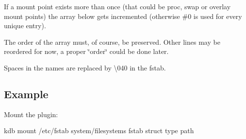 If a mount point exists more than once (that could be proc, swap or overlay mount points) the array below gets incremented (otherwise \#0 is used for every unique entry).

The order of the array must, of course, be preserved. Other lines may be reordered for now, a proper \char`\"{}order\char`\"{} could be done later.

Spaces in the names are replaced by \textbackslash{}040 in the fstab.

\subsection*{Example}

Mount the plugin\+: \begin{DoxyVerb}kdb mount /etc/fstab system/filesystems fstab struct type path\end{DoxyVerb}
 